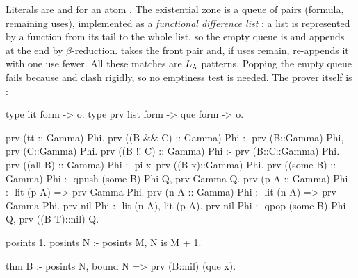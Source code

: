 \noindent Literals are  and  for an atom . The existential zone is a queue of
pairs (formula, remaining uses), implemented as a \emph{functional difference list} : a list is
represented by a function from its tail to the whole list, so the empty queue is  and
 appends at the end by
$\beta$-reduction.  takes the front pair and, if uses remain, re-appends it with one use fewer.
All these matches are $L_\lambda$ patterns. Popping the empty queue fails because  and
 clash rigidly, so no emptiness test is needed. The prover itself is
:

\begin{lprolog}
type lit         form -> o.
type prv         list form -> que form -> o.

prv (tt       :: Gamma) Phi.
prv ((B && C) :: Gamma) Phi :- prv (B::Gamma) Phi,
                               prv (C::Gamma) Phi.
prv ((B !! C) :: Gamma) Phi :- prv (B::C::Gamma) Phi.
prv ((all B)  :: Gamma) Phi :- pi x\ prv ((B x)::Gamma) Phi.
prv ((some B) :: Gamma) Phi :- qpush (some B) Phi Q,
                               prv Gamma Q.
prv (p A      :: Gamma) Phi :- lit (p A) => prv Gamma Phi.
prv (n A      :: Gamma) Phi :- lit (n A) => prv Gamma Phi.
prv nil Phi :- lit (n A), lit (p A).
prv nil Phi :- qpop (some B) Phi Q, prv ((B T)::nil) Q.

posints 1.
posints N :- posints M, N is M + 1.

thm B :- posints N, bound N => prv (B::nil) (que x\x).
\end{lprolog}

